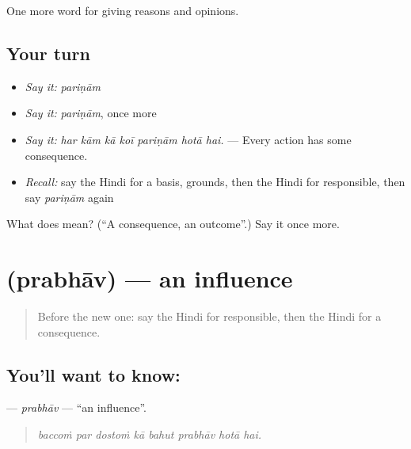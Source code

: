 \begin{grammarlens}[title={What you've built}]
One more word for giving reasons and opinions.
\end{grammarlens}

\subsection*{Your turn}
\begin{itemize}
\raggedright
  \item \emph{Say it:} \emph{pariṇām}
  \item \emph{Say it:} \emph{pariṇām}, once more
  \item \emph{Say it:} \emph{har kām kā koī pariṇām hotā hai.} — Every action has some consequence.
  \item \emph{Recall:} say the Hindi for a basis, grounds, then the Hindi for responsible, then say \emph{pariṇām} again
\end{itemize}

\begin{tcolorbox}[breakable,colback=teal!4,colframe=teal!35!black,title={Before you move on}]
What does  mean? (\textquotedblleft{}A consequence, an outcome\textquotedblright{}.) Say it once more.
\end{tcolorbox}
\section[\texorpdfstring{\hi{प्रभाव} (prabhāv)}{प्रभाव (prabhāv)}]{ (prabhāv) — an influence}

\label{lesson:HI-C344-prabhav}



\begin{quote}
Before the new one: say the Hindi for responsible, then the Hindi for a consequence.
\end{quote}

\subsection*{You'll want to know: }
\textbf{} — \emph{prabhāv} — \textquotedblleft{}an influence\textquotedblright{}.

\begin{quote}
       
\end{quote}

\begin{quote}
\emph{baccoṁ par dostoṁ kā bahut prabhāv hotā hai.}
\end{quote}

